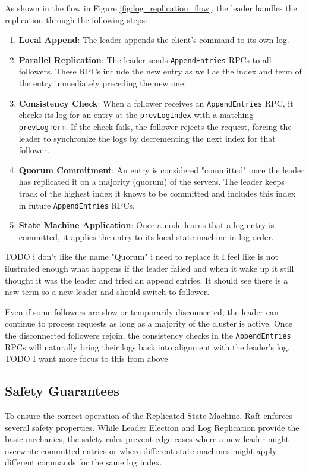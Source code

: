 As shown in the flow in Figure \ref{fig:log_replication_flow}, the leader handles the replication through the following steps:
\begin{enumerate}
    \item \textbf{Local Append}: The leader appends the client's command to its own log.
    \item \textbf{Parallel Replication}: The leader sends \texttt{AppendEntries} RPCs to all followers. These RPCs include the new entry as well as the index and term of the entry immediately preceding the new one.
    \item \textbf{Consistency Check}: When a follower receives an \texttt{AppendEntries} RPC, it checks its log for an entry at the \texttt{prevLogIndex} with a matching \texttt{prevLogTerm}. If the check fails, the follower rejects the request, forcing the leader to synchronize the logs by decrementing the next index for that follower.
    \item \textbf{Quorum Commitment}: An entry is considered "committed" once the leader has replicated it on a majority (quorum) of the servers. The leader keeps track of the highest index it knows to be committed and includes this index in future \texttt{AppendEntries} RPCs.
    \item \textbf{State Machine Application}: Once a node learns that a log entry is committed, it applies the entry to its local state machine in log order. 
\end{enumerate}
TODO i don't like the name "Quorum" i need to replace it 
I feel like is not ilustrated enough what happens if the leader failed and when it wake up it still thought it was the leader and tried an append entries. It should see there is a new term so a new leader and should switch to follower.

Even if some followers are slow or temporarily disconnected, the leader can continue to process requests as long as a majority of the cluster is active. Once the disconnected followers rejoin, the consistency checks in the \texttt{AppendEntries} RPCs will naturally bring their logs back into alignment with the leader's log.
TODO I want more focus to this from above

\subsection{Safety Guarantees}
To ensure the correct operation of the Replicated State Machine, Raft enforces several safety properties. While Leader Election and Log Replication provide the basic mechanics, the safety rules prevent edge cases where a new leader might overwrite committed entries or where different state machines might apply different commands for the same log index.


